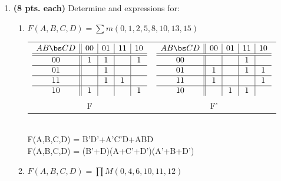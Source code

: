 \begin{enumerate}
\begin{enumerate}
\end{enumerate}

\item {\bf (8 pts. each)} Determine \SOPmin and \POSmin expressions for:
\begin{enumerate}
\item  $F(A,B,C,D) = \sum m(0,1,2,5,8,10,13,15)$

\begin{solution}{

\begin{tabular}{cc}
$\begin{array} {c||c|c|c|c}
   A B \bs C D   & 00 & 01 & 11 & 10 \\ \hline \hline
       00        & 1  & 1  &    & 1  \\ \hline
       01        &    & 1  &    &    \\ \hline
       11        &    & 1  & 1  &    \\ \hline
       10        & 1  &    &    & 1  \\
\end{array}$ &
$\begin{array} {c||c|c|c|c}
   A B \bs C D   & 00 & 01 & 11 & 10 \\ \hline \hline
       00        &    &    & 1  &    \\ \hline
       01        & 1  &    & 1  & 1  \\ \hline
       11        & 1  &    &    & 1  \\ \hline
       10        &    & 1  & 1  &    \\
\end{array}$ \\
F  & F' \\
\end{tabular} \\
\SOPmin F(A,B,C,D) =  B'D'+A'C'D+ABD\\
\POSmin F(A,B,C,D) =  (B'+D)(A+C'+D')(A'+B+D')
} \end{solution}

\item  $F(A,B,C,D) = \prod M(0,4,6,10,11,12)$

\begin{solution}{

}
\end{solution}
\end{enumerate}
\end{enumerate}
